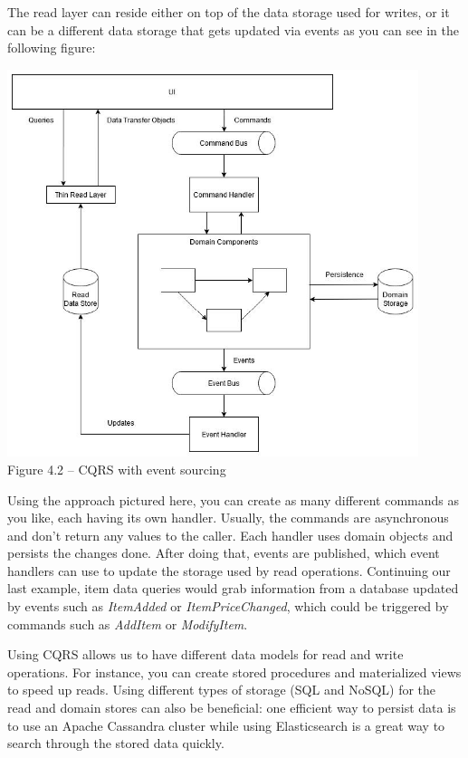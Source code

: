 The read layer can reside either on top of the data storage used for writes, or it can be a different data storage that gets updated via events as you can see in the following figure:


\begin{center}
\includegraphics[width=0.9\textwidth]{content/2/chapter4/images/2.jpg}\\
Figure 4.2 – CQRS with event sourcing
\end{center}

Using the approach pictured here, you can create as many different commands as you like, each having its own handler. Usually, the commands are asynchronous and don't return any values to the caller. Each handler uses domain objects and persists the changes done. After doing that, events are published, which event handlers can use to update the storage used by read operations. Continuing our last example, item data queries would grab information from a database updated by events such as \textit{ItemAdded} or \textit{ItemPriceChanged}, which could be triggered by commands such as \textit{AddItem} or \textit{ModifyItem}.


Using CQRS allows us to have different data models for read and write operations. For instance, you can create stored procedures and materialized views to speed up reads. Using different types of storage (SQL and NoSQL) for the read and domain stores can also be beneficial: one efficient way to persist data is to use an Apache Cassandra cluster while using Elasticsearch is a great way to search through the stored data quickly.

